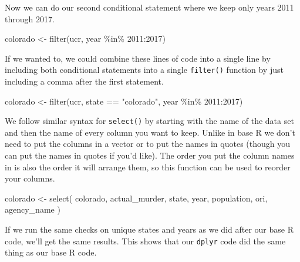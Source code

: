 \documentclass[
]{krantz}
\makeatletter
\newenvironment{Shaded}{\begin{snugshade}}{\end{snugshade}}
\newcommand{\CommentTok}[1]{\textcolor[rgb]{0.37,0.37,0.37}{\textit{#1}}}
\newcommand{\DecValTok}[1]{\textcolor[rgb]{0.06,0.06,0.06}{#1}}
\newcommand{\FunctionTok}[1]{\textcolor[rgb]{0,0,0}{#1}}
\newcommand{\NormalTok}[1]{#1}
\newcommand{\OtherTok}[1]{\textcolor[rgb]{0.37,0.37,0.37}{#1}}
\newcommand{\SpecialCharTok}[1]{\textcolor[rgb]{0,0,0}{#1}}
\newcommand{\StringTok}[1]{\textcolor[rgb]{0.5,0.5,0.5}{#1}}
\newenvironment{kframe}{%
\medskip{}
\setlength{\fboxsep}{.8em}
 \def\at@end@of@kframe{}%
 \ifinner\ifhmode%
  \def\at@end@of@kframe{\end{minipage}}%
  \begin{minipage}{\columnwidth}%
 \fi\fi%
 \def\FrameCommand##1{\hskip\@totalleftmargin \hskip-\fboxsep
 \colorbox{shadecolor}{##1}\hskip-\fboxsep
     \hskip-\linewidth \hskip-\@totalleftmargin \hskip\columnwidth}%
 \MakeFramed {\advance\hsize-\width
   \@totalleftmargin\z@ \linewidth\hsize
   \@setminipage}}%
 {\par\unskip\endMakeFramed%
 \at@end@of@kframe}
\renewenvironment{Shaded}{\begin{kframe}}{\end{kframe}}
\makeatother
\begin{document}
Now we can do our second conditional statement where we keep
only years 2011 through 2017.

\begin{Shaded}
\begin{Highlighting}[]
\NormalTok{colorado }\OtherTok{\textless{}{-}} \FunctionTok{filter}\NormalTok{(ucr, year }\SpecialCharTok{\%in\%} \DecValTok{2011}\SpecialCharTok{:}\DecValTok{2017}\NormalTok{)}
\end{Highlighting}
\end{Shaded}

If we wanted to, we could combine these lines of code into a
single line by including both conditional statements into a
single \texttt{filter()} function by just including a comma
after the first statement.

\begin{Shaded}
\begin{Highlighting}[]
\NormalTok{colorado }\OtherTok{\textless{}{-}} \FunctionTok{filter}\NormalTok{(ucr, state }\SpecialCharTok{==} \StringTok{"colorado"}\NormalTok{, year }\SpecialCharTok{\%in\%} \DecValTok{2011}\SpecialCharTok{:}\DecValTok{2017}\NormalTok{)}
\end{Highlighting}
\end{Shaded}

We follow similar syntax for \texttt{select()} by starting
with the name of the data set and then the name of every
column you want to keep. Unlike in base R we don't need to
put the columns in a vector or to put the names in quotes
(though you can put the names in quotes if you'd like). The
order you put the column names in is also the order it will
arrange them, so this function can be used to reorder your
columns.

\begin{Shaded}
\begin{Highlighting}[]
\NormalTok{colorado }\OtherTok{\textless{}{-}} \FunctionTok{select}\NormalTok{(}
\NormalTok{  colorado, actual\_murder, state,}
\NormalTok{  year, population, ori, agency\_name}
\NormalTok{)}
\end{Highlighting}
\end{Shaded}

If we run the same checks on unique states and years as we
did after our base R code, we'll get the same results. This
shows that our \texttt{dplyr} code did the same thing as our
base R code.

\begin{Shaded}
\end{Shaded}
\end{document}
